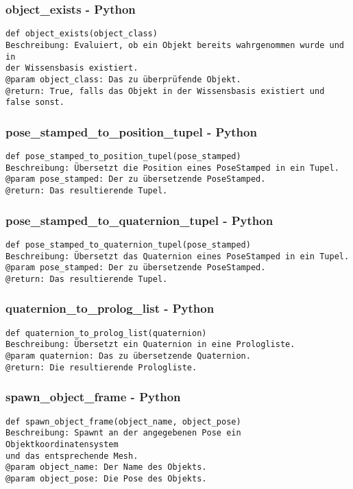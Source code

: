\documentclass{suturo}
\begin{document}
\subsubsection{object\_exists - Python}
\begin{verbatim}
def object_exists(object_class)
Beschreibung: Evaluiert, ob ein Objekt bereits wahrgenommen wurde und in 
der Wissensbasis existiert.
@param object_class: Das zu überprüfende Objekt.
@return: True, falls das Objekt in der Wissensbasis existiert und false sonst.
\end{verbatim}

\subsubsection{pose\_stamped\_to\_position\_tupel - Python}
\begin{verbatim}
def pose_stamped_to_position_tupel(pose_stamped)
Beschreibung: Übersetzt die Position eines PoseStamped in ein Tupel.
@param pose_stamped: Der zu übersetzende PoseStamped.
@return: Das resultierende Tupel.
\end{verbatim}

\subsubsection{pose\_stamped\_to\_quaternion\_tupel - Python}
\begin{verbatim}
def pose_stamped_to_quaternion_tupel(pose_stamped)
Beschreibung: Übersetzt das Quaternion eines PoseStamped in ein Tupel.
@param pose_stamped: Der zu übersetzende PoseStamped.
@return: Das resultierende Tupel.
\end{verbatim}

\subsubsection{quaternion\_to\_prolog\_list - Python}
\begin{verbatim}
def quaternion_to_prolog_list(quaternion)
Beschreibung: Übersetzt ein Quaternion in eine Prologliste.
@param quaternion: Das zu übersetzende Quaternion.
@return: Die resultierende Prologliste.
\end{verbatim}

\subsubsection{spawn\_object\_frame - Python}
\begin{verbatim}
def spawn_object_frame(object_name, object_pose)
Beschreibung: Spawnt an der angegebenen Pose ein Objektkoordinatensystem 
und das entsprechende Mesh.
@param object_name: Der Name des Objekts.
@param object_pose: Die Pose des Objekts.
\end{verbatim}
\end{document}
